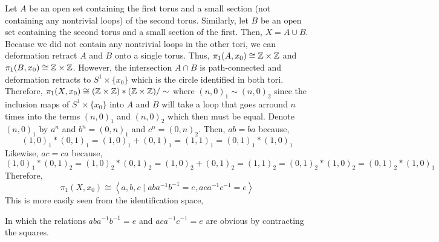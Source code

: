 \documentclass[12pt]{extarticle}
\begin{document}
Let $A$ be an open set containing the first torus and a small section (not containing any nontrivial loops) of the second torus. Similarly, let $B$ be an open set containing the second torus and a small section of the first. Then, $X = A \cup B$. Because we did not contain any nontrivial loops in the other tori, we can deformation retract $A$ and $B$ onto a single torus. Thus, $\pi_1(A, x_0) \cong \mathbb{Z} \times \mathbb{Z} $ and $\pi_1(B, x_0) \cong \mathbb{Z} \times \mathbb{Z}$. However, the intersection $A \cap B$ is path-connected and deformation retracts to $S^1 \times \{x_0\}$ which is the circle identified in both tori. Therefore, $\pi_1(X, x_0) \cong (\mathbb{Z} \times \mathbb{Z}) * ( \mathbb{Z} \times \mathbb{Z} ) / \sim$ where $(n, 0)_1 \sim (n, 0)_2$ since the inclusion maps of $S^1 \times \{x_0\}$ into $A$ and $B$ will take a loop that goes arround $n$ times into the terms $(n, 0)_1$ and $(n, 0)_2$ which then must be equal. Denote $(n, 0)_1$ by $a^n$ and $b^n = (0, n)_1$ and $c^n = (0, n)_2$. Then, $ab = ba$ because,
\[(1, 0)_1 * (0, 1)_1 = (1, 0)_1 + (0, 1)_1 = (1, 1)_1 = (0, 1)_1 * (1, 0)_1\]
Likewise, $ac = ca$ because,
\[(1, 0)_1 * (0, 1)_2 = (1, 0)_2 * (0, 1)_2 = (1, 0)_2 + (0, 1)_2 = (1, 1)_2 = (0, 1)_2 * (1, 0)_2 = (0, 1)_2 * (1, 0)_1\]
Therefore,
\[ \pi_1(X, x_0) \cong \left< a, b, c \mid aba^{-1}b^{-1} = e, aca^{-1}c^{-1} = e \right> \]
This is more easily seen from the identification space,
\begin{center}
\end{center}
In which the relations $aba^{-1}b^{-1} = e$ and $aca^{-1}c^{-1} = e$ are obvious  by contracting the squares.  
\end{document}
